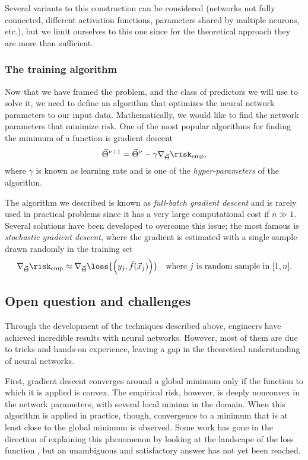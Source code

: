 Several variants to this construction can be considered (networks not fully connected, different activation functions, parameters shared by multiple neurons, etc.),
but we limit ourselves to this one since for the theoretical approach they are more than sufficient.
\subsubsection{The training algorithm}
Now that we have framed the problem, and the class of predictors we will use to solve it,
we need to define an algorithm that optimizes the neural network parameters to our input data.
Mathematically, we would like to find the network parameters that minimize risk.
One of the most popular algorithms for finding the minimum of a function is gradient descent
\[
  \vec{\Theta}^{\nu+1} = \vec{\Theta}^{\nu} - \gamma \nabla_{\vec{\Theta}} \risk_\text{emp},
\]
where \(\gamma\) is known as learning rate and is one of the \emph{hyper-parameters} of the algorithm.

The algorithm we described is known as \emph{full-batch gradient descent} and is rarely used in practical problems since it has a very large computational cost if \(n\gg1\).
Several solutions have been developed to overcome this issue; the most famous is \emph{stochastic gradient descent},
where the gradient is estimated with a single sample drawn randomly in the training set
\[
  \nabla_{\vec{\Theta}} \risk_\text{emp} \approx \nabla_{\vec{\Theta}}\loss{\left(y_j,\hat{f}{(\vec{x}_j)}\right)}\quad
  \text{where $j$ is random sample in }[1,n].
\]

\subsection{Open question and challenges}
Through the development of the techniques described above, engineers have achieved incredible results with neural networks. However, most of them are due to tricks and hands-on experience, leaving a gap in the theoretical understanding of neural networks.

First, gradient descent converges around a global minimum only if the function to which it is applied is convex.
The empirical risk, however, is deeply nonconvex in the network parameters, with several local minima in the domain.
When this algorithm is applied in practice, though, convergence to a minimum that is at least close to the global minimum is observed.
Some work has gone in the direction of explaining this phenomenon by looking at the landscape of the loss function \cite{sarao2020optimization,sarao2020complex}, but an unambiguous and satisfactory answer has not yet been reached.

